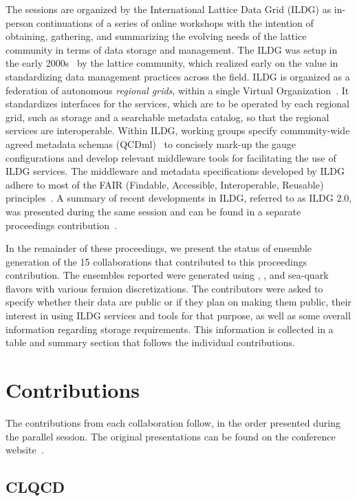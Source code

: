 \documentclass[a4paper,11pt]{article}
\begin{document}
The sessions are organized by the International Lattice Data Grid
(ILDG) as in-person continuations of a series of online workshops with
the intention of obtaining, gathering, and summarizing the evolving
needs of the lattice community in terms of data storage and
management.  The ILDG was setup in the early
2000s~\cite{Davies:2002mu,Yoshie:2008aw,Maynard:2009szr,Beckett:2009cb}
by the lattice community, which realized early on the value in
standardizing data management practices across the field. ILDG is
organized as a federation of autonomous \textit{regional grids},
within a single Virtual Organization~\cite{ildg-organization}. It
standardizes interfaces for the services, which are to be operated by
each regional grid, such as storage and a searchable metadata catalog,
so that the regional services are interoperable. Within ILDG, working
groups specify community-wide agreed metadata schemas
(QCDml)~\cite{Coddington:2007gz} to concisely mark-up the gauge
configurations and develop relevant middleware tools for facilitating
the use of ILDG services. The middleware and metadata specifications
developed by ILDG adhere to most of the FAIR (Findable, Accessible,
Interoperable, Reusable) principles~\cite{Wilkinson2016}. A summary of
recent developments in ILDG, referred to as ILDG 2.0, was presented
during the same session and can be found in a separate proceedings
contribution~\cite{ILDG2}.

In the remainder of these proceedings, we present the status of
ensemble generation of the 15 collaborations that contributed to this
proceedings contribution. The ensembles reported were generated using
, , and  sea-quark flavors with
various fermion discretizations. The contributors were asked to
specify whether their data are public or if they plan on making them
public, their interest in using ILDG services and tools for that
purpose, as well as some overall information regarding storage
requirements. This information is collected in a table and summary
section that follows the individual contributions.

\section{Contributions}
The contributions from each collaboration follow, in the order
presented during the parallel session. The original presentations can
be found on the conference website~\cite{parallel-session}.

\subsection{CLQCD}
\end{document}
